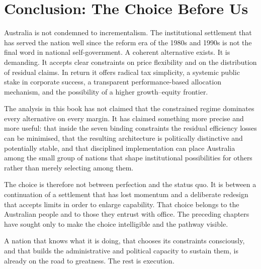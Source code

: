 \documentclass[12pt,anyside]{book}
\theoremstyle{definition}
\theoremstyle{plain}
\theoremstyle{remark}
\begin{document}
\section{Conclusion: The Choice Before Us}

Australia is not condemned to incrementalism. The institutional settlement that has served the nation well since the reform era of the 1980s and 1990s is not the final word in national self-government. A coherent alternative exists. It is demanding. It accepts clear constraints on price flexibility and on the distribution of residual claims. In return it offers radical tax simplicity, a systemic public stake in corporate success, a transparent performance-based allocation mechanism, and the possibility of a higher growth–equity frontier.

The analysis in this book has not claimed that the constrained regime dominates every alternative on every margin. It has claimed something more precise and more useful: that inside the seven binding constraints the residual efficiency losses can be minimised, that the resulting architecture is politically distinctive and potentially stable, and that disciplined implementation can place Australia among the small group of nations that shape institutional possibilities for others rather than merely selecting among them.

The choice is therefore not between perfection and the status quo. It is between a continuation of a settlement that has lost momentum and a deliberate redesign that accepts limits in order to enlarge capability. That choice belongs to the Australian people and to those they entrust with office. The preceding chapters have sought only to make the choice intelligible and the pathway visible.

A nation that knows what it is doing, that chooses its constraints consciously, and that builds the administrative and political capacity to sustain them, is already on the road to greatness. The rest is execution.

\end{document}
